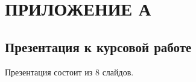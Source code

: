 \chapter*{ПРИЛОЖЕНИЕ А}

\section*{Презентация к курсовой работе}
Презентация состоит из 8 слайдов. 


